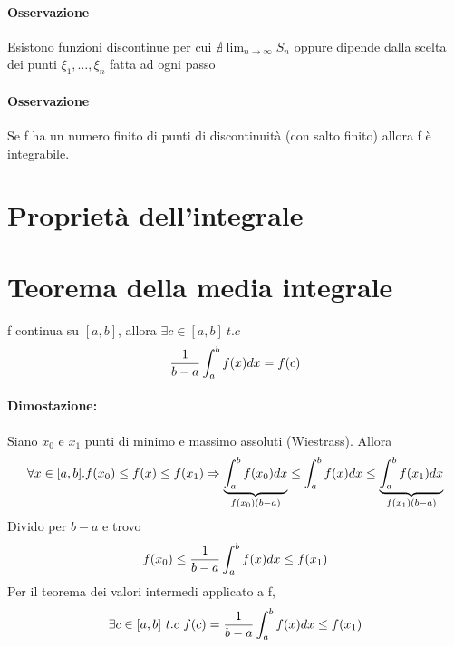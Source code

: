 \paragraph{Osservazione} Esistono funzioni discontinue per cui $ \nexists \lim_{n \to \infty} S_n$ oppure dipende dalla scelta dei punti $ \xi_1 , \dots, \xi_n $ fatta ad ogni passo

\paragraph{Osservazione} Se f ha un numero finito di punti di discontinuità (con salto finito) allora f è integrabile.

\section{Proprietà dell'integrale}


\section{Teorema della media integrale}
f continua su $[a,b]$, allora $ \exists c \in [a,b] \ t.c $\\
$$
{1 \over b-a} \int_a^b f(x) dx = f(c)
$$
\paragraph{Dimostazione:} Siano $x_0$ e $x_1$ punti di minimo e massimo assoluti (Wiestrass). Allora \\
$$ 	\forall x \in [a,b] . f(x_0) \le f(x) \le f(x_1)\\
	\Rightarrow \underbrace{\int_a^b f(x_0) dx}_{f(x_0)(b-a)} \le \int_a^b f(x) dx \le \underbrace{\int_a^b f(x_1) dx}_{f(x_1)(b-a)}
$$
Divido per $b-a$ e trovo
$$
f(x_0) \le {1 \over b-a} \int_a^b f(x) dx \le f(x_1)
$$
Per il teorema dei valori intermedi applicato a f, $$ \exists c \in [a,b] \ t.c \ f(c) ={1 \over b-a} \int_a^b f(x) dx \le f(x_1)
$$

